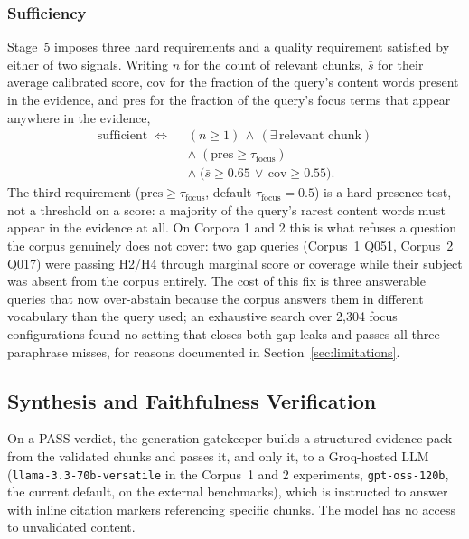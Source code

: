 \documentclass[conference]{IEEEtran}
\begin{document}
\subsubsection{Sufficiency}
\label{sec:sufficiency}
Stage~5 imposes three hard requirements and a quality requirement
satisfied by either of two signals. Writing $n$ for the count of
relevant chunks, $\bar{s}$ for their average calibrated score,
$\mathrm{cov}$ for the fraction of the query's content words present
in the evidence, and $\mathrm{pres}$ for the fraction of the query's
focus terms that appear anywhere in the evidence,
\begin{equation}
\begin{split}
\mathrm{sufficient} \;\Longleftrightarrow\;\;
& (n \geq 1)\,\wedge\,(\exists\,\text{relevant chunk})\\[2pt]
& \wedge\;(\mathrm{pres} \geq \tau_{\text{focus}})\\[2pt]
& \wedge\;\bigl(\bar{s} \geq 0.65 \,\vee\, \mathrm{cov} \geq 0.55\bigr).
\end{split}
\label{eq:suff}
\end{equation}
The third requirement ($\mathrm{pres} \geq \tau_{\text{focus}}$,
default $\tau_{\text{focus}} = 0.5$) is a hard presence test, not a
threshold on a score: a majority of the query's rarest content words
must appear in the evidence at all. On Corpora 1 and 2 this is what refuses
a question the corpus genuinely does not cover: two gap queries (Corpus~1 Q051,
Corpus~2 Q017) were passing H2/H4 through marginal score or coverage
while their subject was absent from the corpus entirely. The cost of
this fix is three answerable queries that now over-abstain because the
corpus answers them in different vocabulary than the query used;
an exhaustive search over 2{,}304 focus configurations found no setting
that closes both gap leaks and passes all three paraphrase misses,
for reasons documented in Section~\ref{sec:limitations}.


\subsection{Synthesis and Faithfulness Verification}
\label{sec:synthesis}
On a PASS verdict, the generation gatekeeper builds a structured evidence
pack from the validated chunks and passes it, and only it, to a
Groq-hosted LLM (\texttt{llama-3.3-70b-versatile} in the Corpus~1 and 2
experiments, \texttt{gpt-oss-120b}, the current default, on the external
benchmarks), which is instructed to answer with inline
citation markers referencing specific chunks. The model has no access to
unvalidated content.
\end{document}
